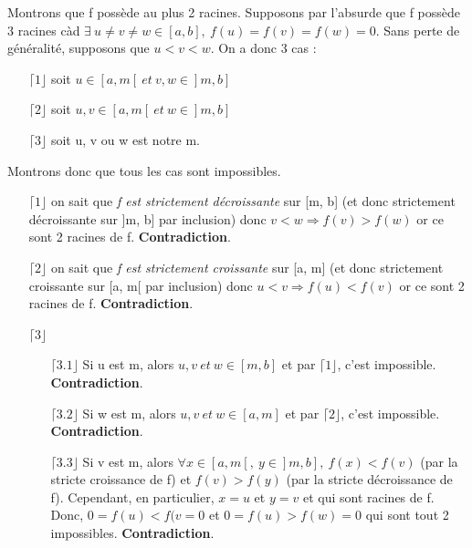 \documentclass[a4paper, 12pt]{article}
\begin{document}
Montrons que f possède au plus 2 racines. \newline \newline
Supposons par l'absurde que f possède 3 racines càd \newline
\( \exists ~ u \neq v \neq w \in [a, b], ~ f(u) = f(v) = f(w) = 0 \). \newline
Sans perte de généralité, supposons que \( u < v < w \). \newline
On a donc 3 cas :
\begin{enumerate}
	\item[\(\lceil 1 \rfloor\)] soit \( u \in [a, m[ ~ et ~ v, w \in ]m, b] \)
	\item[\(\lceil 2 \rfloor\)] soit \( u, v \in [a, m[ ~ et ~ w \in ]m, b] \)
	\item[\(\lceil 3 \rfloor\)] soit u, v ou w est notre m.
\end{enumerate}
Montrons donc que tous les cas sont impossibles.
\begin{enumerate}
	\item[\(\lceil 1 \rfloor\)] on sait que \emph{f est strictement décroissante} sur [m, b] (et donc strictement décroissante sur ]m, b] par inclusion) donc \( v < w \Rightarrow f(v) > f(w) \) or ce sont 2 racines de f. \textbf{Contradiction}.
	\item[\(\lceil 2 \rfloor\)] on sait que \emph{f est strictement croissante} sur [a, m] (et donc strictement croissante sur [a, m[ par inclusion) donc \( u < v \Rightarrow f(u) < f(v) \) or ce sont 2 racines de f. \textbf{Contradiction}.
	\item[\(\lceil 3 \rfloor\)] $~$ \newline
	\begin{enumerate}
		\item[\(\lceil 3.1 \rfloor\)] Si u est m, alors \( u, v ~ et ~ w \in [m, b] \) et par \(\lceil 1 \rfloor\), c'est impossible. \textbf{Contradiction}.
		\item[\(\lceil 3.2 \rfloor\)] Si w est m, alors \( u, v ~ et ~ w \in [a, m] \) et par \(\lceil 2 \rfloor\), c'est impossible. \textbf{Contradiction}.
		\item[\(\lceil 3.3 \rfloor\)] Si v est m, alors \( \forall x \in [a, m[, ~ y \in ]m, b], ~ f(x) < f(v) \) (par la stricte croissance de f) et \( f(v) > f(y)\) (par la stricte décroissance de f). Cependant, en particulier, \( x = u \) et \( y = v \) et qui sont racines de f. Donc, \( 0 = f(u) < f(v = 0 \) et \( 0 = f(u) > f(w) = 0 \) qui sont tout 2 impossibles. \textbf{Contradiction}.
	\end{enumerate}
\end{enumerate}
\end{document}
